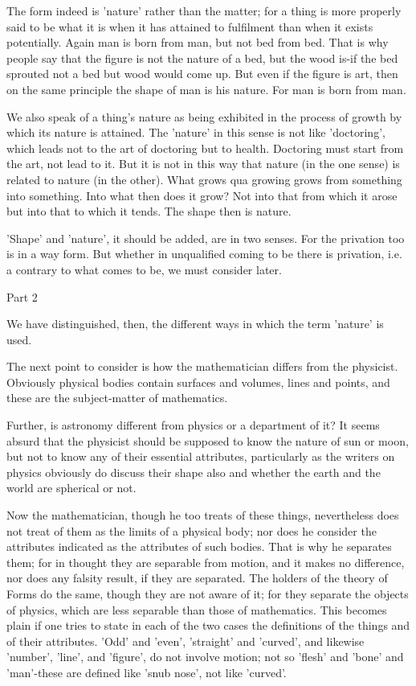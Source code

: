 The form indeed is 'nature' rather than the matter; for a thing is
more properly said to be what it is when it has attained to fulfilment
than when it exists potentially. Again man is born from man, but not
bed from bed. That is why people say that the figure is not the nature
of a bed, but the wood is-if the bed sprouted not a bed but wood would
come up. But even if the figure is art, then on the same principle
the shape of man is his nature. For man is born from man.

We also speak of a thing's nature as being exhibited in the process
of growth by which its nature is attained. The 'nature' in this sense
is not like 'doctoring', which leads not to the art of doctoring but
to health. Doctoring must start from the art, not lead to it. But
it is not in this way that nature (in the one sense) is related to
nature (in the other). What grows qua growing grows from something
into something. Into what then does it grow? Not into that from which
it arose but into that to which it tends. The shape then is nature.

'Shape' and 'nature', it should be added, are in two senses. For the
privation too is in a way form. But whether in unqualified coming
to be there is privation, i.e. a contrary to what comes to be, we
must consider later. 

Part 2

We have distinguished, then, the different ways in which the term
'nature' is used. 

The next point to consider is how the mathematician differs from the
physicist. Obviously physical bodies contain surfaces and volumes,
lines and points, and these are the subject-matter of mathematics.

Further, is astronomy different from physics or a department of it?
It seems absurd that the physicist should be supposed to know the
nature of sun or moon, but not to know any of their essential attributes,
particularly as the writers on physics obviously do discuss their
shape also and whether the earth and the world are spherical or not.

Now the mathematician, though he too treats of these things, nevertheless
does not treat of them as the limits of a physical body; nor does
he consider the attributes indicated as the attributes of such bodies.
That is why he separates them; for in thought they are separable from
motion, and it makes no difference, nor does any falsity result, if
they are separated. The holders of the theory of Forms do the same,
though they are not aware of it; for they separate the objects of
physics, which are less separable than those of mathematics. This
becomes plain if one tries to state in each of the two cases the definitions
of the things and of their attributes. 'Odd' and 'even', 'straight'
and 'curved', and likewise 'number', 'line', and 'figure', do not
involve motion; not so 'flesh' and 'bone' and 'man'-these are defined
like 'snub nose', not like 'curved'. 


